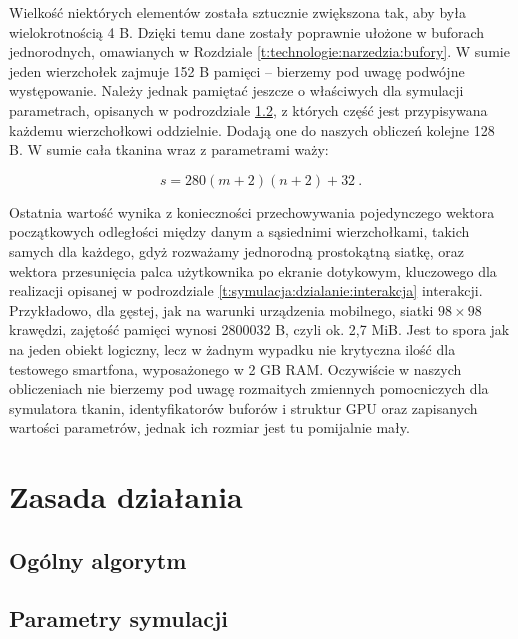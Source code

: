 	Wielkość niektórych elementów została sztucznie zwiększona tak, aby była wielokrotnością 4 B. Dzięki temu dane zostały poprawnie ułożone w buforach jednorodnych, omawianych w Rozdziale \ref{t:technologie:narzedzia:bufory}. W sumie jeden wierzchołek zajmuje 152 B pamięci -- bierzemy pod uwagę podwójne występowanie. Należy jednak pamiętać jeszcze o właściwych dla symulacji parametrach, opisanych w podrozdziale \ref{t:symulacja:dzialanie:parametry}, z których część jest przypisywana każdemu wierzchołkowi oddzielnie. Dodają one do naszych obliczeń kolejne 128 B. W sumie cała tkanina wraz z parametrami waży:
	
	\begin{equation}
	s = 280(m + 2)(n + 2) + 32 \ .
	\end{equation} 
	
	Ostatnia wartość wynika z konieczności przechowywania pojedynczego wektora początkowych odległości między danym a sąsiednimi wierzchołkami, takich samych dla każdego, gdyż rozważamy jednorodną prostokątną siatkę, oraz wektora przesunięcia palca użytkownika po ekranie dotykowym, kluczowego dla realizacji opisanej w podrozdziale \ref{t:symulacja:dzialanie:interakcja} interakcji. Przykładowo, dla gęstej, jak na warunki urządzenia mobilnego, siatki \( 98 \times 98 \) krawędzi, zajętość pamięci wynosi 2800032 B, czyli ok. 2,7 MiB. Jest to spora jak na jeden obiekt logiczny, lecz w żadnym wypadku nie krytyczna ilość dla testowego smartfona, wyposażonego w 2 GB RAM. Oczywiście w naszych obliczeniach nie bierzemy pod uwagę rozmaitych zmiennych pomocniczych dla symulatora tkanin, identyfikatorów buforów i struktur GPU oraz zapisanych wartości parametrów, jednak ich rozmiar jest tu pomijalnie mały.
	
	\section{Zasada działania}
	\label{t:symulacja:dzialanie}
	
		\subsection{Ogólny algorytm}
		\label{t:symulacja:dzialanie:algorytm}
		
		
	
		\subsection{Parametry symulacji}
		\label{t:symulacja:dzialanie:parametry}
			

